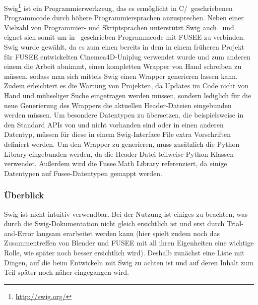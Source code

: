 \label{sec:SWIG}

Swig\footnote{\url{http://swig.org/}} ist ein Programmierwerkzeug, das es ermöglicht in C/\CC~geschriebenen Programmcode durch höhere Programmiersprachen anzusprechen. Neben einer Vielzahl von Programmier- und Skriptsprachen unterstützt Swig auch \CS~und eignet sich somit um in \CC~geschrieben Programmcode mit FUSEE zu verbinden. Swig wurde gewählt, da es zum einen bereits in dem in einem früheren Projekt für FUSEE entwickelten  Cinemea4D-Uniplug verwendet wurde und zum anderen einem die Arbeit abnimmt, einen kompletten Wrapper von Hand schreiben zu müssen, sodass man sich mittels Swig einen Wrapper generieren lassen kann. Zudem erleichtert es die Wartung von Projekten, da Updates im Code nicht von Hand und mühseliger Suche eingetragen werden müssen, sondern lediglich für die neue Generierung des Wrappers die aktuellen Header-Dateien eingebunden werden müssen. Um besondere Datentypen zu übersetzen, die beispielsweise in den Standard APIs von \CC und \CS nicht vorhanden sind oder in einen anderen Datentyp, müssen für diese in einem Swig-Interface File extra Vorschriften definiert werden.
Um den Wrapper zu generieren, muss zusätzlich die Python Library eingebunden werden, da die Header-Datei teilweise Python Klassen verwendet. Außerdem wird die Fusee.Math Library referenziert, da einige Datentypen auf Fusee-Datentypen gemappt werden.

\subsubsection{Überblick}
Swig ist nicht intuitiv verwendbar. Bei der Nutzung ist einiges zu beachten, was durch die Swig-Dokumentation nicht gleich ersichtlich ist und erst durch Trial-and-Error langsam erarbeitet werden kann (hier spielt zudem noch das Zusammentreffen von Blender und FUSEE mit all ihren Eigenheiten eine wichtige Rolle, wie später noch besser ersichtlich wird). Deshalb zunächst eine Liste mit Dingen, auf die beim Entwickeln mit Swig zu achten ist und auf deren Inhalt zum Teil später noch näher eingegangen wird.

